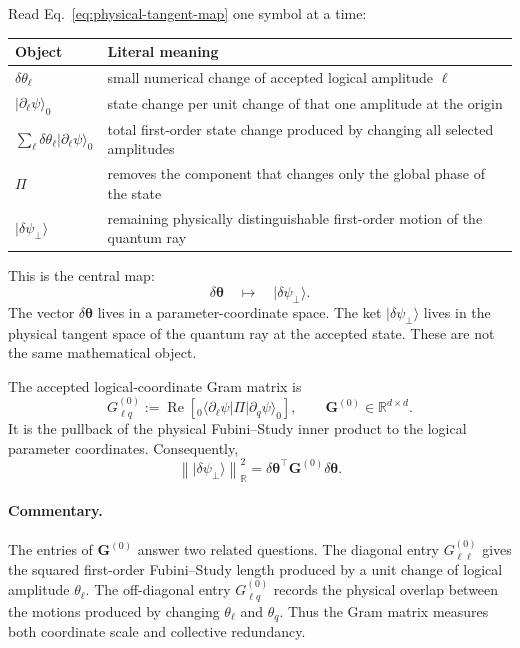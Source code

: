 \documentclass[11pt]{article}
\newcommand{\ket}[1]{\lvert #1\rangle}
\newcommand{\bra}[1]{\langle #1\rvert}
\newcommand{\R}{\mathbb R}
\newcommand{\commentary}{\paragraph{Commentary.}}
\begin{document}
Read Eq.~\eqref{eq:physical-tangent-map} one symbol at a time:
\begin{center}
\renewcommand{\arraystretch}{1.18}
\begin{tabular}{@{}p{}p{}@{}}
\toprule
Object & Literal meaning \\
\midrule
\(\delta\theta_\ell\) &
small numerical change of accepted logical amplitude \(\ell\) \\
\(\ket{\partial_\ell\psi}_{0}\) &
state change per unit change of that one amplitude at the origin \\
\(\sum_\ell\delta\theta_\ell\ket{\partial_\ell\psi}_{0}\) &
total first-order state change produced by changing all selected amplitudes \\
\(\Pi\) &
removes the component that changes only the global phase of the state \\
\(\ket{\delta\psi_\perp}\) &
remaining physically distinguishable first-order motion of the quantum ray \\
\bottomrule
\end{tabular}
\end{center}

This is the central map:
\begin{equation}
\boxed{
\delta\boldsymbol\theta
\quad\longmapsto\quad
\ket{\delta\psi_\perp}.
}
\label{eq:logical-to-physical}
\end{equation}
The vector \(\delta\boldsymbol\theta\) lives in a parameter-coordinate space.
The ket \(\ket{\delta\psi_\perp}\) lives in the physical tangent space of the
quantum ray at the accepted state.  These are not the same mathematical
object.

The accepted logical-coordinate Gram matrix is
\begin{equation}
G_{\ell q}^{(0)}
:=
\operatorname{Re}
\left[
{}_{0}\!\bra{\partial_\ell\psi}
\Pi
\ket{\partial_q\psi}_{0}
\right],
\qquad
\mathbf G^{(0)}\in\R^{d\times d}.
\label{eq:logical-gram}
\end{equation}
It is the pullback of the physical Fubini--Study inner product to the logical
parameter coordinates.  Consequently,
\begin{equation}
\left\|\ket{\delta\psi_\perp}\right\|_{\R}^{2}
=
\delta\boldsymbol\theta^\top
\mathbf G^{(0)}
\delta\boldsymbol\theta.
\label{eq:fs-length}
\end{equation}

\commentary The entries of \(\mathbf G^{(0)}\) answer two related questions.
The diagonal entry \(G_{\ell\ell}^{(0)}\) gives the squared first-order
Fubini--Study length produced by a unit change of logical amplitude
\(\theta_\ell\).  The off-diagonal entry \(G_{\ell q}^{(0)}\) records the
physical overlap between the motions produced by changing
\(\theta_\ell\) and \(\theta_q\).  Thus the Gram matrix measures both
coordinate scale and collective redundancy.
\end{document}
